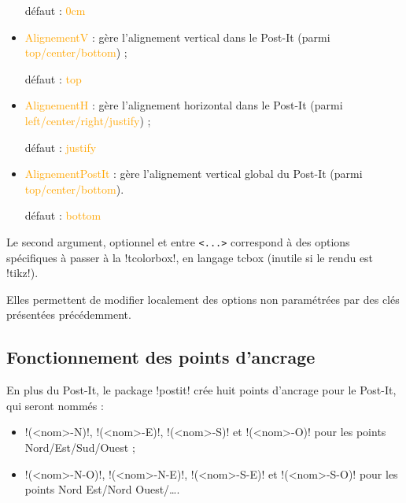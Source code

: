 \documentclass[french,a4paper,11pt]{article}
\newcommand\Cle[1]{{\small\sffamily\textlangle \textcolor{orange}{#1}\textrangle}}
\begin{document}
\begin{tipblock}
\begin{itemize}
	\hfill{}défaut : \Cle{0cm}
	\item \Cle{AlignementV} : gère l'alignement vertical dans le Post-It (parmi \Cle{top/center/bottom}) ;
	
	\hfill{}défaut : \Cle{top}
	\item \Cle{AlignementH} : gère l'alignement horizontal dans le Post-It (parmi \Cle{left/center/right/justify}) ;
	
	\hfill{}défaut : \Cle{justify}
	\item \Cle{AlignementPostIt} : gère l'alignement vertical global du Post-It (parmi \Cle{top/center/bottom}).
	
	\hfill{}défaut : \Cle{bottom}
\end{itemize}
\vspace*{-\baselineskip}\leavevmode
\end{tipblock}

\begin{tipblock}
Le second argument, optionnel et entre \texttt{<...>} correspond à des options spécifiques à passer à la \motcletex!tcolorbox!, en langage \textsf{tcbox} (inutile si le rendu est \motcletex!tikz!).

Elles permettent de modifier localement des options non paramétrées par des clés présentées précédemment.
\end{tipblock}

\subsection{Fonctionnement des points d'ancrage}

\begin{tipblock}
En plus du Post-It, le package \packagetex!postit! crée huit points d'ancrage pour le Post-It, qui seront nommés :

\begin{itemize}
	\item \motcletex!(<nom>-N)!, \motcletex!(<nom>-E)!, \motcletex!(<nom>-S)! et \motcletex!(<nom>-O)! pour les points Nord/Est/Sud/Ouest ;
	\item \motcletex!(<nom>-N-O)!, \motcletex!(<nom>-N-E)!, \motcletex!(<nom>-S-E)! et \motcletex!(<nom>-S-O)! pour les points Nord Est/Nord Ouest/\ldots.
\end{itemize}
\end{tipblock}

\begin{DemoCode}[]
\begin{center}
\begin{PostIt}[Inclinaison=10,Attache=Non,Rendu=tikz,RappelPostIt=MaPetiteNote1]
	\lipsum[1][1-2]
\end{PostIt}
\end{center}
\end{DemoCode}
\end{document}
